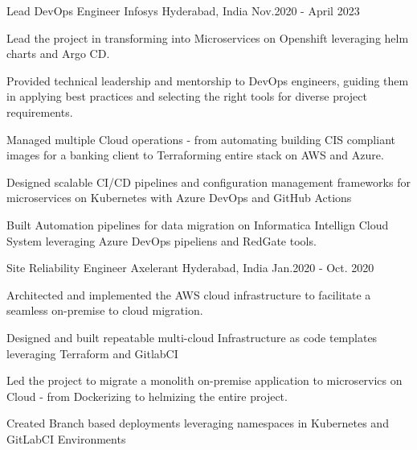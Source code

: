 \begin{cventries}
\vspace{1\baselineskip}
  \cventry
    { Lead DevOps Engineer } %
    {Infosys} %
    {Hyderabad, India} %
    {Nov.2020 - April 2023 } %
    {
      \begin{cvitems} %
        \item {Lead the project in transforming into Microservices on Openshift leveraging helm charts and Argo CD.}
        \item {Provided technical leadership and mentorship to DevOps engineers, guiding them in applying best practices and selecting the right tools for diverse project requirements. }
        \item {Managed multiple Cloud operations - from automating building CIS compliant images for a banking client to Terraforming entire stack on AWS and Azure. }
        \item {Designed scalable CI/CD pipelines and configuration management frameworks for microservices on Kubernetes with Azure DevOps and GitHub Actions}
        \item {Built Automation pipelines for data migration on Informatica Intellign Cloud System leveraging Azure DevOps pipeliens and RedGate tools.}
      \end{cvitems}
    }
\vspace{1\baselineskip}
  \cventry
    { Site Reliability Engineer } %
    {Axelerant} %
    {Hyderabad, India} %
    {Jan.2020 - Oct. 2020 } %
    {
      \begin{cvitems} %
        \item {Architected and implemented the AWS cloud infrastructure to facilitate a seamless on-premise to cloud migration. } 
        \item {Designed and built repeatable multi-cloud Infrastructure as code templates leveraging Terraform and GitlabCI}
        \item {Led the project to migrate a monolith on-premise application to microservics on Cloud - from Dockerizing to helmizing the entire project. }
        \item {Created Branch based deployments leveraging namespaces in Kubernetes and GitLabCI Environments}
      \end{cvitems}
    }

\end{cventries}
